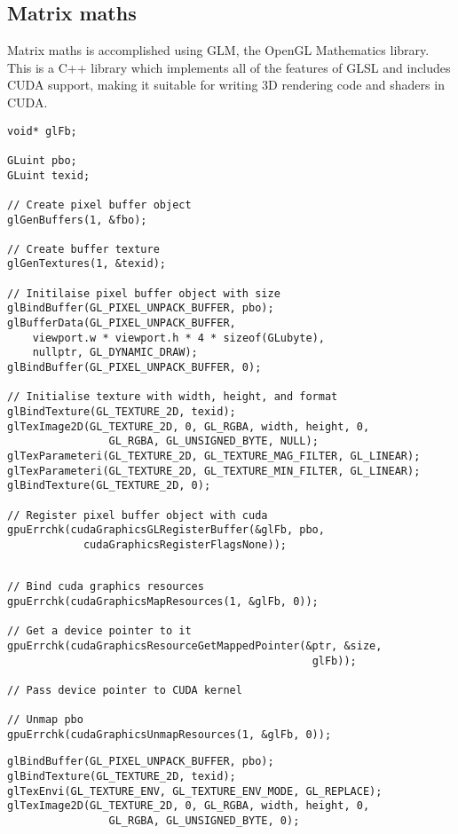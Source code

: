 \subsection{Matrix maths}
Matrix maths is accomplished using GLM, the OpenGL Mathematics library. This is a C++ library which implements all of the features of GLSL and includes CUDA support, making it suitable for writing 3D rendering code and shaders in CUDA.

\newpage
{}
\begin{lstlisting}[frame=single]
void* glFb;

GLuint pbo;
GLuint texid;

// Create pixel buffer object
glGenBuffers(1, &fbo);

// Create buffer texture
glGenTextures(1, &texid);

// Initilaise pixel buffer object with size
glBindBuffer(GL_PIXEL_UNPACK_BUFFER, pbo);
glBufferData(GL_PIXEL_UNPACK_BUFFER,
	viewport.w * viewport.h * 4 * sizeof(GLubyte),
	nullptr, GL_DYNAMIC_DRAW);
glBindBuffer(GL_PIXEL_UNPACK_BUFFER, 0);

// Initialise texture with width, height, and format
glBindTexture(GL_TEXTURE_2D, texid);
glTexImage2D(GL_TEXTURE_2D, 0, GL_RGBA, width, height, 0,
				GL_RGBA, GL_UNSIGNED_BYTE, NULL);
glTexParameteri(GL_TEXTURE_2D, GL_TEXTURE_MAG_FILTER, GL_LINEAR);
glTexParameteri(GL_TEXTURE_2D, GL_TEXTURE_MIN_FILTER, GL_LINEAR);
glBindTexture(GL_TEXTURE_2D, 0);

// Register pixel buffer object with cuda
gpuErrchk(cudaGraphicsGLRegisterBuffer(&glFb, pbo,
			cudaGraphicsRegisterFlagsNone));
\end{lstlisting}

\newpage
{}
\begin{lstlisting}[frame=single]

// Bind cuda graphics resources
gpuErrchk(cudaGraphicsMapResources(1, &glFb, 0));

// Get a device pointer to it
gpuErrchk(cudaGraphicsResourceGetMappedPointer(&ptr, &size,
												glFb));

// Pass device pointer to CUDA kernel

// Unmap pbo
gpuErrchk(cudaGraphicsUnmapResources(1, &glFb, 0));
\end{lstlisting}

\begin{lstlisting}[frame=single]
glBindBuffer(GL_PIXEL_UNPACK_BUFFER, pbo);
glBindTexture(GL_TEXTURE_2D, texid);
glTexEnvi(GL_TEXTURE_ENV, GL_TEXTURE_ENV_MODE, GL_REPLACE);
glTexImage2D(GL_TEXTURE_2D, 0, GL_RGBA, width, height, 0,
				GL_RGBA, GL_UNSIGNED_BYTE, 0);
\end{lstlisting}